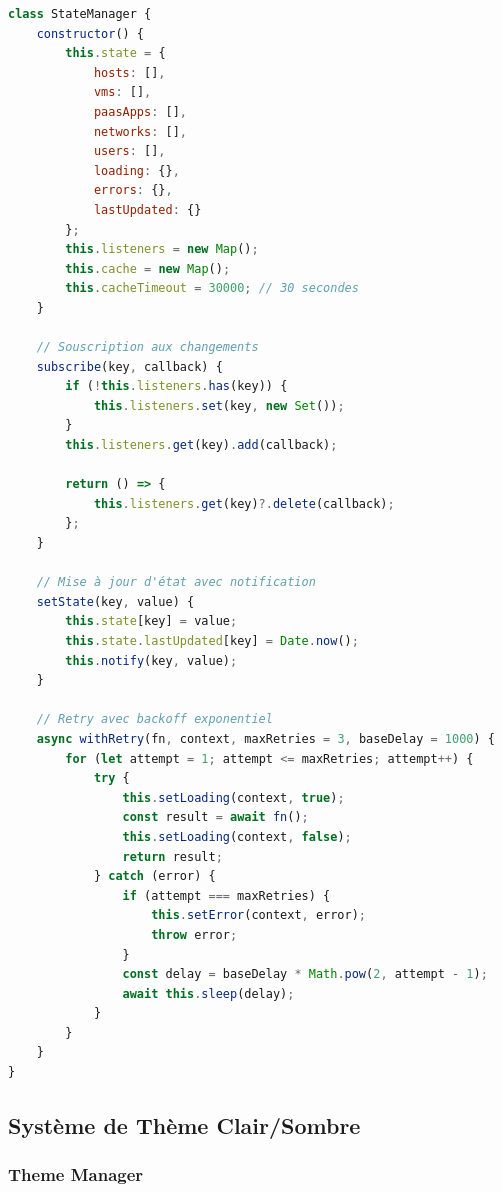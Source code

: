 \documentclass[12pt,a4paper]{article}
\begin{document}
\begin{lstlisting}[language=JavaScript,caption=Gestion d'état (state-manager.js)]
class StateManager {
    constructor() {
        this.state = {
            hosts: [],
            vms: [],
            paasApps: [],
            networks: [],
            users: [],
            loading: {},
            errors: {},
            lastUpdated: {}
        };
        this.listeners = new Map();
        this.cache = new Map();
        this.cacheTimeout = 30000; // 30 secondes
    }
    
    // Souscription aux changements
    subscribe(key, callback) {
        if (!this.listeners.has(key)) {
            this.listeners.set(key, new Set());
        }
        this.listeners.get(key).add(callback);
        
        return () => {
            this.listeners.get(key)?.delete(callback);
        };
    }
    
    // Mise à jour d'état avec notification
    setState(key, value) {
        this.state[key] = value;
        this.state.lastUpdated[key] = Date.now();
        this.notify(key, value);
    }
    
    // Retry avec backoff exponentiel
    async withRetry(fn, context, maxRetries = 3, baseDelay = 1000) {
        for (let attempt = 1; attempt <= maxRetries; attempt++) {
            try {
                this.setLoading(context, true);
                const result = await fn();
                this.setLoading(context, false);
                return result;
            } catch (error) {
                if (attempt === maxRetries) {
                    this.setError(context, error);
                    throw error;
                }
                const delay = baseDelay * Math.pow(2, attempt - 1);
                await this.sleep(delay);
            }
        }
    }
}
\end{lstlisting}

\subsection{Système de Thème Clair/Sombre}

\subsubsection{Theme Manager}
\end{document}
